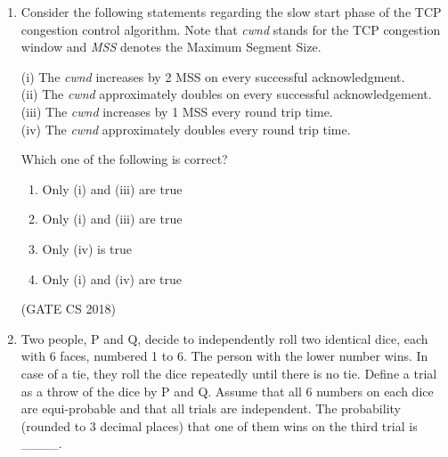 \documentclass[12pt]{article}
\begin{document}
\begin{enumerate}
\begin{multicols}{2}
\begin{enumerate}
\item P--III, Q--IV, R--II, S--I
\item P--II, Q--I, R--IV, S--III
\item P--IV, Q--I, R--II, S--III
\item P--IV, Q--I, R--III, S--II
\end{enumerate}
\end{multicols}

(GATE CS 2018)

\item Consider the following statements regarding the slow start phase of the TCP congestion control algorithm. Note that \textit{cwnd} stands for the TCP congestion window and \textit{MSS} denotes the Maximum Segment Size.

\noindent(i) The \textit{cwnd} increases by 2 MSS on every successful acknowledgment.\\
(ii) The \textit{cwnd} approximately doubles on every successful acknowledgement.\\
(iii) The \textit{cwnd} increases by 1 MSS every round trip time.\\
(iv) The \textit{cwnd} approximately doubles every round trip time.

\noindent Which one of the following is correct?

\begin{multicols}{2}
\begin{enumerate}
\item Only (i) and (iii) are true
\item Only (i) and (iii) are true
\item Only (iv) is true
\item Only (i) and (iv) are true
\end{enumerate}
\end{multicols}

(GATE CS 2018)

\item Two people, P and Q, decide to independently roll two identical dice, each with 6 faces, numbered 1 to 6. The person with the lower number wins. In case of a tie, they roll the dice repeatedly until there is no tie. Define a trial as a throw of the dice by P and Q. Assume that all 6 numbers on each dice are equi-probable and that all trials are independent. The probability (rounded to 3 decimal places) that one of them wins on the third trial is \_\_\_\_.


\end{enumerate}
\end{document}
